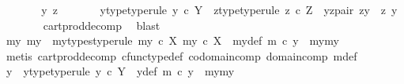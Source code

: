 \begin{isabellebody}
\ \ \ \ \isamarkupfalse%
\ \isamarkupfalse%
\ y\ z\ \isanewline
\ \ \ \ \ \ y{\isacharunderscore}{\kern0pt}type{\isacharbrackleft}{\kern0pt}type{\isacharunderscore}{\kern0pt}rule{\isacharbrackright}{\kern0pt}{\isacharcolon}{\kern0pt}\ {\isachardoublequoteopen}y\ {\isasymin}\isactrlsub c\ Y{\isachardoublequoteclose}\ \ z{\isacharunderscore}{\kern0pt}type{\isacharbrackleft}{\kern0pt}type{\isacharunderscore}{\kern0pt}rule{\isacharbrackright}{\kern0pt}{\isacharcolon}{\kern0pt}\ {\isachardoublequoteopen}z\ {\isasymin}\isactrlsub c\ Z{\isachardoublequoteclose}\ \ yz{\isacharunderscore}{\kern0pt}pair{\isacharcolon}{\kern0pt}\ {\isachardoublequoteopen}zy\ {\isacharequal}{\kern0pt}\ {\isasymlangle}z{\isacharcomma}{\kern0pt}\ y{\isasymrangle}{\isachardoublequoteclose}\isanewline
\ \ \ \ \ \ \isamarkupfalse%
\ cart{\isacharunderscore}{\kern0pt}prod{\isacharunderscore}{\kern0pt}decomp\ \isamarkupfalse%
\ blast\isanewline
\ \ \ \ \isamarkupfalse%
\ \isamarkupfalse%
\ my{}\ my{}\ \ my{\isacharunderscore}{\kern0pt}types{\isacharbrackleft}{\kern0pt}type{\isacharunderscore}{\kern0pt}rule{\isacharbrackright}{\kern0pt}{\isacharcolon}{\kern0pt}\ {\isachardoublequoteopen}my{}\ {\isasymin}\isactrlsub c\ X{\isachardoublequoteclose}\ {\isachardoublequoteopen}my{}\ {\isasymin}\isactrlsub c\ X{\isachardoublequoteclose}\ \ my{\isacharunderscore}{\kern0pt}def{\isacharcolon}{\kern0pt}\ {\isachardoublequoteopen}m\ {\isasymcirc}\isactrlsub c\ y\ {\isacharequal}{\kern0pt}\ {\isasymlangle}my{}{\isacharcomma}{\kern0pt}my{}{\isasymrangle}{\isachardoublequoteclose}\isanewline
\ \ \ \ \ \ \isamarkupfalse%
\ {\isacharparenleft}{\kern0pt}metis\ cart{\isacharunderscore}{\kern0pt}prod{\isacharunderscore}{\kern0pt}decomp\ cfunc{\isacharunderscore}{\kern0pt}type{\isacharunderscore}{\kern0pt}def\ codomain{\isacharunderscore}{\kern0pt}comp\ domain{\isacharunderscore}{\kern0pt}comp\ m{\isacharunderscore}{\kern0pt}def{\isacharparenleft}{\kern0pt}{}{\isacharparenright}{\kern0pt}{\isacharparenright}{\kern0pt}\isanewline
\ \ \ \ \isamarkupfalse%
\ \isamarkupfalse%
\ y{\isacharprime}{\kern0pt}\ \ y{\isacharprime}{\kern0pt}{\isacharunderscore}{\kern0pt}type{\isacharbrackleft}{\kern0pt}type{\isacharunderscore}{\kern0pt}rule{\isacharbrackright}{\kern0pt}{\isacharcolon}{\kern0pt}\ {\isachardoublequoteopen}y{\isacharprime}{\kern0pt}\ {\isasymin}\isactrlsub c\ Y{\isachardoublequoteclose}\ \ y{\isacharprime}{\kern0pt}{\isacharunderscore}{\kern0pt}def{\isacharcolon}{\kern0pt}\ {\isachardoublequoteopen}m\ {\isasymcirc}\isactrlsub c\ y{\isacharprime}{\kern0pt}\ {\isacharequal}{\kern0pt}\ {\isasymlangle}my{}{\isacharcomma}{\kern0pt}my{}{\isasymrangle}{\isachardoublequoteclose}\isanewline

\end{isabellebody}
